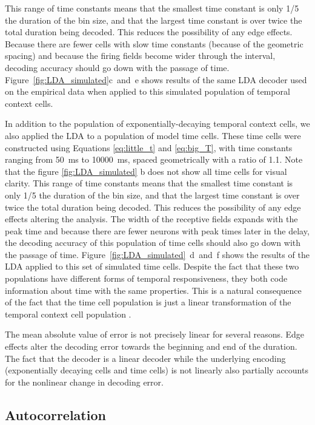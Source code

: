 \documentclass{apa}
\begin{document}
This range of time constants means that the smallest time constant is only 1/5 the duration of the bin size, and that the largest time constant is over twice the total duration being decoded.  This reduces the possibility of any edge effects.
Because there are fewer cells with slow time constants (because of the geometric spacing) and because the firing fields become wider through the interval, decoding accuracy should go down with the
passage of time.  
Figure~\ref{fig:LDA_simulated}c~and~e shows results of the same LDA decoder used on
the empirical data when applied to this simulated population of  temporal
context cells.  

In addition to the population of exponentially-decaying temporal context
cells, we also applied the LDA to a population of model time cells.  
These time cells were constructed using Equations \eqref{eq:little_t} and \eqref{eq:big_T}, with time constants ranging from 50~ms to 10000~ms, spaced geometrically with a ratio of 1.1. 
Note that the figure \ref{fig:LDA_simulated} b does not show all time cells for visual clarity.
This range of time constants means that the smallest time constant is only 1/5 the duration of the bin size, and that the largest time constant is over twice the total duration being decoded.  This reduces the possibility of any edge effects altering the analysis.
 The width of the receptive fields expands with the peak time and
because there are fewer neurons with peak times later in the delay, the
decoding accuracy of this population of time cells should also go down with
the passage of time.
Figure~\ref{fig:LDA_simulated}~d~and~f shows the results of the LDA applied to
this set of simulated time cells.  Despite the fact that these two populations
have different forms of temporal responsiveness, they both code information
about time with the same properties.  This is a natural consequence of the
fact that the time cell population is just a linear transformation of the
temporal context cell population \cite{ShanHowa13}. 

The mean absolute value of error is not precisely linear for several reasons.  Edge effects alter the decoding error towards the beginning and end of the duration.  The fact that the decoder is a linear decoder while the underlying encoding (exponentially decaying cells and time cells) is not linearly also partially accounts for the nonlinear change in decoding error.

\subsection{Autocorrelation}
\end{document}
